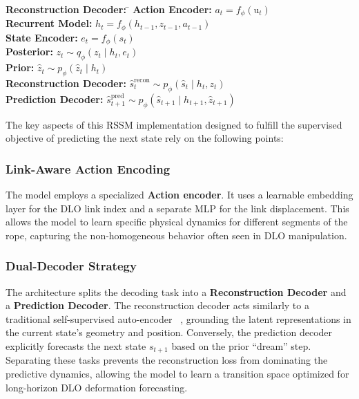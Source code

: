 \documentclass[letterpaper, 10 pt, conference]{ieeeconf}  %
\begin{document}
\begin{tabbing}
\textbf{Reconstruction Decoder:} \qquad \= \kill 
\textbf{Action Encoder:} \> $a_t = f_\phi(\text{u}_t)$ \\
\textbf{Recurrent Model:} \> $h_t = f_\phi(h_{t-1}, z_{t-1}, a_{t-1})$ \\
\textbf{State Encoder:} \> $e_t = f_\phi(s_t)$ \\
\textbf{Posterior:} \> $z_t \sim q_\phi(z_t \mid h_t, e_t)$ \\
\textbf{Prior:} \> $\hat{z}_t \sim p_\phi(\hat{z}_t \mid h_t)$ \\
\textbf{Reconstruction Decoder:} \> $\hat{s}_t^{\text{recon}} \sim p_\phi(\hat{s}_t \mid h_t, z_t)$ \\
\textbf{Prediction Decoder:} \> $\hat{s}_{t+1}^{\text{pred}} \sim p_\phi(\hat{s}_{t+1} \mid h_{t+1}, \hat{z}_{t+1})$
\end{tabbing}

The key aspects of this RSSM implementation designed to fulfill the supervised objective of predicting the next state rely on the following points:

\subsubsection{Link-Aware Action Encoding}
The model employs a specialized \textbf{Action encoder}. It uses a learnable embedding layer for the DLO link index and a separate MLP for the link displacement. This allows the model to learn specific physical dynamics for different segments of the rope, capturing the non-homogeneous behavior often seen in DLO manipulation.

\subsubsection{Dual-Decoder Strategy}
The architecture splits the decoding task into a \textbf{Reconstruction Decoder} and a \textbf{Prediction Decoder}. The reconstruction decoder acts similarly to a traditional self-supervised auto-encoder ~\cite{hinton_reducing_2006}, grounding the latent representations in the current state's geometry and position. Conversely, the prediction decoder explicitly forecasts the next state $s_{t+1}$ based on the prior ``dream'' step. Separating these tasks prevents the reconstruction loss from dominating the predictive dynamics, allowing the model to learn a transition space optimized for long-horizon DLO deformation forecasting.
\end{document}
